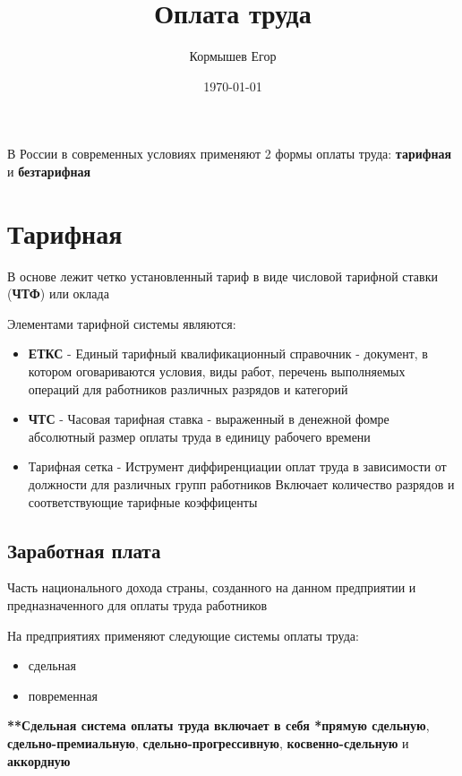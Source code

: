 \documentclass[11pt]{article}
\author{Кормышев Егор}
\date{\today}
\title{Оплата труда}
\begin{document}
\maketitle
\tableofcontents

В России в современных условиях применяют 2 формы оплаты труда: \textbf{тарифная} и \textbf{безтарифная}

\section{Тарифная}
\label{sec:orgd004ea4}

В основе лежит четко установленный тариф в виде числовой тарифной ставки (\textbf{ЧТФ}) или оклада

Элементами тарифной системы являются:

\begin{itemize}
\item \textbf{ЕТКС} - Единый тарифный квалификационный справочник - документ, в котором оговариваются условия, виды работ, перечень выполняемых операций для работников различных разрядов и категорий
\item \textbf{ЧТС} - Часовая тарифная ставка - выраженный в денежной фомре абсолютный размер оплаты труда в единицу рабочего времени
\item Тарифная сетка - Иструмент диффиренциации оплат труда в зависимости от должности для различных групп работников \newline Включает количество разрядов и соответствующие тарифные коэффиценты
\end{itemize}

\subsection{Заработная плата}
\label{sec:orgadbc095}

Часть национального дохода страны, созданного на данном предприятии и предназначенного для оплаты труда работников

На предприятиях применяют следующие системы оплаты труда:

\begin{itemize}
\item сдельная
\item повременная
\end{itemize}

\textbf{**Сдельная система оплаты труда включает в себя *прямую сдельную}, \textbf{сдельно-премиальную}, \textbf{сдельно-прогрессивную}, \textbf{косвенно-сдельную} и \textbf{аккордную}
\end{document}
